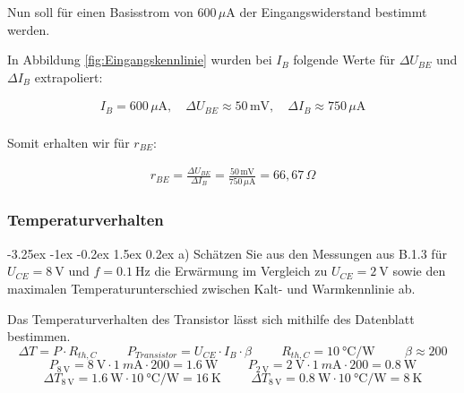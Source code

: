\documentclass[
	a4paper, %
	12pt, %
]{CSUniSchoolLabReport}
\makeatletter
\renewcommand\paragraph{\@startsection{paragraph}{4}{\z@}%
  {-3.25ex \@plus -1ex \@minus -0.2ex}%
  {1.5ex \@plus 0.2ex}%
  {\normalfont\normalsize\bfseries}}
\newcommand{\milli}{m}
\makeatother
\begin{document}
Nun soll für einen Basisstrom von $600\,\mu\text{A}$ der Eingangswiderstand bestimmt werden.



In Abbildung \ref{fig:Eingangskennlinie} wurden bei $I_{B}$ folgende Werte für $\Delta U_{BE}$ und $\Delta I_B$ extrapoliert:

\[
\begin{aligned}
I_B = 600\,\mu\text{A}, \quad \Delta U_{BE} \approx 50\,\text{mV}, \quad \Delta I_B \approx 750\,\mu\text{A} \\
\end{aligned}
\]

\vspace{1em}

Somit erhalten wir für $r_{BE}$:

\[
\begin{aligned}
r_{BE} = \frac{\Delta U_{BE}}{\Delta I_B} = \frac{50\,\text{mV}}{750\,\mu\text{A}} = 66{,}67\,\Omega
\end{aligned}
\]

\subsubsection{Temperaturverhalten}
\paragraph{a) Schätzen Sie aus den Messungen aus B.1.3 für $U_{CE} = \SI{8}{\volt}$ und $f = \SI{0.1}{\hertz}$ die Erwärmung im Vergleich zu $U_{CE} = \SI{2}{\volt}$ sowie den maximalen Temperaturunterschied zwischen Kalt- und Warmkennlinie ab.}

Das Temperaturverhalten des Transistor lässt sich mithilfe des Datenblatt bestimmen. 
\[
\Delta T = P \cdot R_{th,C} \hspace{1cm} P_{Transistor} = U_{CE} \cdot I_{B} \cdot \beta \hspace{1cm} R_{th,C} = \SI{10}{\degreeCelsius\per\watt} \hspace{1cm} \beta \approx 200
\]
\[
P_{\SI{8}{\volt}} = \SI{8}{\volt} \cdot \SI{1}{\milli\ampere} \cdot 200 = \SI{1.6}{\watt} \hspace{1cm} P_{\SI{2}{\volt}} = \SI{2}{\volt} \cdot \SI{1}{\milli\ampere} \cdot 200 = \SI{0.8}{\watt}
\]
\[
\Delta T_{\SI{8}{\volt}} = \SI{1.6}{\watt} \cdot \SI{10}{\degreeCelsius\per\watt} = \SI{16}{\kelvin} \hspace{1cm} \Delta T_{\SI{8}{\volt}} = \SI{0.8}{\watt} \cdot \SI{10}{\degreeCelsius\per\watt} = \SI{8}{\kelvin}
\]
\end{document}
